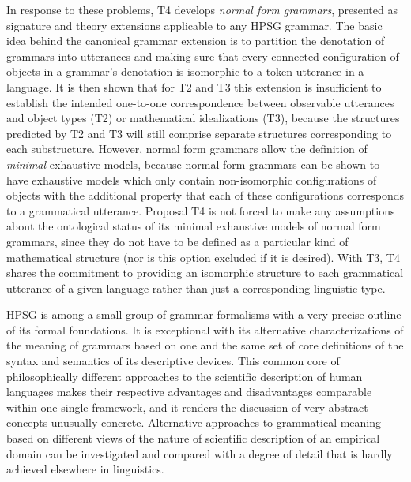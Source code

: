 \documentclass[output=paper
                ,modfonts
                ,nonflat
	        ,collection
	        ,collectionchapter
	        ,collectiontoclongg
 	        ,biblatex
                ,babelshorthands
                ,newtxmath
                ,draftmode
                ,colorlinks, citecolor=brown
]{./langsci/langscibook}
\begin{document}
{{In response to these problems, T4 develops \emph{normal form
  grammars}, presented as signature and theory extensions applicable
to any HPSG grammar. The basic idea behind the canonical grammar
extension is to partition the denotation of grammars into utterances
and making sure that every connected configuration of objects in a
grammar's denotation is isomorphic to a token utterance in a
language. It is then shown that for T2 and T3 this extension is
insufficient to establish the intended one-to-one correspondence
between observable utterances and object types (T2) or mathematical
idealizations (T3), because the structures predicted by T2 and T3 will
still comprise separate structures corresponding to each
substructure. However, normal form grammars allow the definition of
\emph{minimal} exhaustive models, because normal form grammars can be
shown to have exhaustive models which only contain non-isomorphic
configurations of objects with the additional property that each of
these configurations corresponds to a grammatical utterance. Proposal
T4 is not forced to make any assumptions about the ontological status of
its minimal exhaustive models of normal form grammars, since they do
not have to be defined as a particular kind of mathematical structure
(nor is this option excluded if it is desired). With T3, T4 shares the
commitment to providing an isomorphic structure to each grammatical
utterance of a given language rather than just a corresponding linguistic
type.


HPSG is among a small group of grammar formalisms with a very precise
outline of its formal foundations. It is exceptional with its
alternative characterizations of the meaning of grammars based on one
and the same set of core definitions of the syntax and semantics of
its descriptive devices. This common core of philosophically different
approaches to the scientific description of human languages makes their
respective advantages and disadvantages comparable within one single
framework, and it renders the discussion of very abstract concepts
unusually concrete.  Alternative approaches to grammatical meaning
based on different views of the nature of scientific description of an
empirical domain can be investigated and compared with a degree of
detail that is hardly achieved elsewhere in linguistics.

}




}
\end{document}
